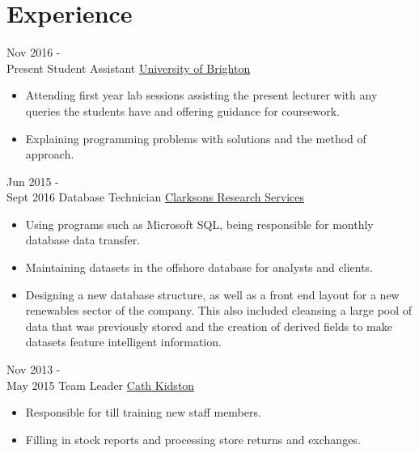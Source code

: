 \documentclass[letterpaper]{twentysecondcv} %
\begin{document}

\vspace{-1mm}
\section{Experience}
\vspace{-1mm}
\begin{twenty} %
	\twentyitem
    	{Nov 2016 - \\Present}
        {Student Assistant}
        {\href{https://www.brighton.ac.uk/index.aspx}{University of Brighton}}
        {}
        {
        {\begin{itemize}
        \item Attending first year lab sessions assisting the present lecturer with any queries the students have and offering guidance for coursework.
        \item Explaining programming problems with solutions and the method of approach.
    \end{itemize}}
        }
        
    \twentyitem
   		{Jun 2015 - \\ Sept 2016}
        {Database Technician}
        {\href{http://www.clarksons.com/services/research/}{Clarksons Research Services}}
        {}
        {
        {\begin{itemize}
        \item Using programs such as Microsoft SQL, being responsible for monthly database data transfer.
        \item Maintaining datasets in the offshore database for analysts and clients.
        \item Designing a new database structure, as well as a front end layout for a new renewables sector of the company. This also included cleansing a large pool of data that was previously stored and the creation of derived fields to make datasets feature intelligent information.
    \end{itemize}}
        }
        
     \twentyitem
   		{Nov 2013 - \\ May 2015}
        {Team Leader}
        {\href{http://www.cathkidston.com/}{Cath Kidston}}
        {}
        {
        \begin{itemize}
        \item Responsible for till training new staff members.
        \item Filling in stock reports and processing store returns and exchanges.
    \end{itemize}
    	}
        
\end{twenty}
\end{document}
